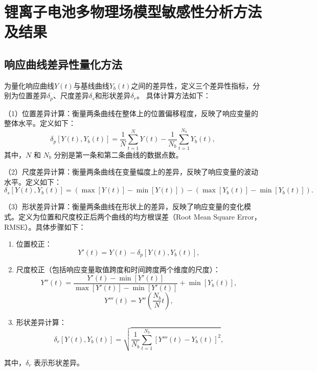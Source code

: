 \chapter{锂离子电池多物理场模型敏感性分析方法及结果}\label{app:sa-results}

\section{响应曲线差异性量化方法}\label{sec:sa-delta}

为量化响应曲线$Y(t)$与基线曲线$Y_b(t)$之间的差异性，定义三个差异性指标，分别为位置差异$\delta_p$、尺度差异$\delta_s$和形状差异$\delta_r$。
具体计算方法如下：

（1）位置差异计算：衡量两条曲线在整体上的位置偏移程度，反映了响应变量的整体水平。定义如下：
\begin{equation}\label{eq:delta-p}
    \delta_p[Y(t), Y_b(t)] = \frac{1}{N} \sum_{t=1}^{N} Y(t) - \frac{1}{N_b} \sum_{t=1}^{N_b} Y_b(t),
\end{equation}
其中，$N$ 和 $N_b$ 分别是第一条和第二条曲线的数据点数。

（2）尺度差异计算：衡量两条曲线在变量幅度上的差异，反映了响应变量的波动水平。定义如下：
\begin{equation}\label{eq:delta-s}
    \delta_{s}[Y(t), Y_b(t)] = \left( \max[Y(t)] - \min[Y(t)] \right) - \left( \max[Y_b(t)] - \min[Y_b(t)] \right).
\end{equation}

（3）形状差异计算：衡量两条曲线在形状上的差异，反映了响应变量的变化模式。定义为位置和尺度校正后两个曲线的均方根误差（Root Mean Square Error， RMSE）。具体步骤如下：
\begin{enumerate}[label=Step\arabic*:]
    \item 位置校正：
          \begin{equation}
              Y'(t) = Y(t) - \delta_p\left[Y(t), Y_b(t)\right],
          \end{equation}
    \item 尺度校正（包括响应变量取值跨度和时间跨度两个维度的尺度）：
          \begin{equation}
              Y''(t) = \frac{Y'(t) - \min\left[Y'(t)\right]}{\max\left[Y'(t)\right] - \min\left[Y'(t)\right]} + \min\left[Y_b(t)\right],
          \end{equation}
          \begin{equation}
              Y'''(t) = Y''\left(\frac{N_b}{N} t\right),
          \end{equation}
    \item 形状差异计算：
          \begin{equation}\label{eq:delta-r}
              \delta_r\left[Y(t), Y_b(t)\right] = \sqrt{\frac{1}{N_b} \sum_{t=1}^{N_b} \left[Y'''(t) - Y_b(t)\right]^2},
          \end{equation}
\end{enumerate}
其中，$\delta_r$ 表示形状差异。

